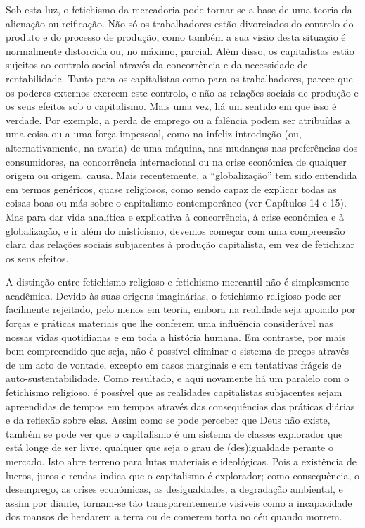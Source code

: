 Sob esta luz, o fetichismo da mercadoria pode tornar-se a base de uma teoria da alienação ou reificação. Não só os trabalhadores estão divorciados do controlo do produto e do processo de produção, como também a sua visão desta situação é normalmente distorcida ou, no máximo, parcial. Além disso, os capitalistas estão sujeitos ao controlo social através da concorrência e da necessidade de rentabilidade. Tanto para os capitalistas como para os trabalhadores, parece que os poderes externos exercem este controlo, e não as relações sociais de produção e os seus efeitos sob o capitalismo. Mais uma vez, há um sentido em que isso é verdade. Por exemplo, a perda de emprego ou a falência podem ser atribuídas a uma coisa ou a uma força impessoal, como na infeliz introdução (ou, alternativamente, na avaria) de uma máquina, nas mudanças nas preferências dos consumidores, na concorrência internacional ou na crise económica de qualquer origem ou origem. causa. Mais recentemente, a “globalização” tem sido entendida em termos genéricos, quase religiosos, como sendo capaz de explicar todas as coisas boas ou más sobre o capitalismo contemporâneo (ver Capítulos {\color{blue}14} e {\color{blue}15}). Mas para dar vida analítica e explicativa à concorrência, à crise económica e à globalização, e ir além do misticismo, devemos começar com uma compreensão clara das relações sociais subjacentes à produção capitalista, em vez de fetichizar os seus efeitos.
 \par 
A distinção entre fetichismo religioso e fetichismo mercantil não é simplesmente acadêmica. Devido às suas origens imaginárias, o fetichismo religioso pode ser facilmente rejeitado, pelo menos em teoria, embora na realidade seja apoiado por forças e práticas materiais que lhe conferem uma influência considerável nas nossas vidas quotidianas e em toda a história humana. Em contraste, por mais bem compreendido que seja, não é possível eliminar o sistema de preços através de um acto de vontade, excepto em casos marginais e em tentativas frágeis de auto-sustentabilidade. Como resultado, e aqui novamente há um paralelo com o fetichismo religioso, é possível que as realidades capitalistas subjacentes sejam apreendidas de tempos em tempos através das consequências das práticas diárias e da reflexão sobre elas. Assim como se pode perceber que Deus não existe, também se pode ver que o capitalismo é um sistema de classes explorador que está longe de ser livre, qualquer que seja o grau de (des)igualdade perante o mercado. Isto abre terreno para lutas materiais e ideológicas. Pois a existência de lucros, juros e rendas indica que o capitalismo é explorador; como consequência, o desemprego, as crises económicas, as desigualdades, a degradação ambiental, e assim por diante, tornam-se tão transparentemente visíveis como a incapacidade dos mansos de herdarem a terra ou de comerem torta no céu quando morrem.
